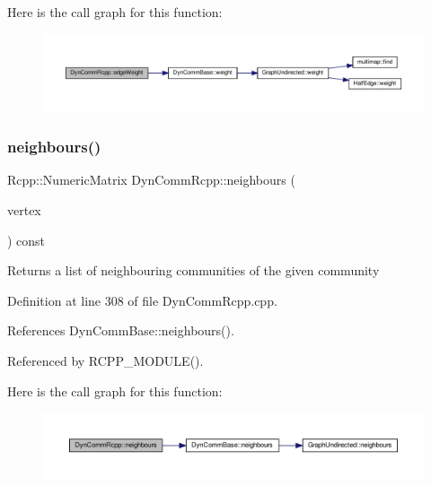 Here is the call graph for this function\+:
\nopagebreak
\begin{figure}[H]
\begin{center}
\leavevmode
\includegraphics[width=350pt]{classDynCommRcpp_a9a9aaf2512541f308d935e48c583f410_cgraph}
\end{center}
\end{figure}
\mbox{\label{classDynCommRcpp_abbda8cc950c360c1b89859ebe9233535}} 
\subsubsection{\texorpdfstring{neighbours()}{neighbours()}}
{\footnotesize\ttfamily Rcpp\+::\+Numeric\+Matrix Dyn\+Comm\+Rcpp\+::neighbours (\begin{DoxyParamCaption}\item[{\hyperlink{edge_8h_a5fbd20c46956d479cb10afc9855223f6}{type\+Vertex}}]{vertex }\end{DoxyParamCaption}) const\hspace{0.3cm}{\ttfamily [inline]}}

\begin{DoxyReturn}{Returns}
a list of neighbouring communities of the given community 
\end{DoxyReturn}


Definition at line 308 of file Dyn\+Comm\+Rcpp.\+cpp.



References Dyn\+Comm\+Base\+::neighbours().



Referenced by R\+C\+P\+P\+\_\+\+M\+O\+D\+U\+L\+E().

Here is the call graph for this function\+:
\nopagebreak
\begin{figure}[H]
\begin{center}
\leavevmode
\includegraphics[width=350pt]{classDynCommRcpp_abbda8cc950c360c1b89859ebe9233535_cgraph}
\end{center}
\end{figure}
\mbox{\label{classDynCommRcpp_a3d9d6845d9e67941da187bca511cdfcf}} 

